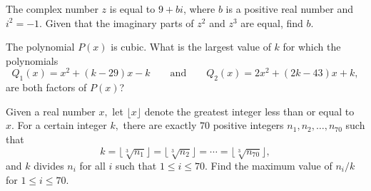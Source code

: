 %	


















\begin{question}[name={2007 AIME I, \href{https://artofproblemsolving.com/community/c4p784537}{Problem 3}}]
	The complex number $z$ is equal to $9+bi$, where $b$ is a positive real number and $i^{2}=-1$. Given that the imaginary parts of $z^{2}$ and $z^{3}$ are equal, find $b$.	
\end{question}


%	













\begin{question}[name={2007 AIME I, \href{https://artofproblemsolving.com/community/c4p784590}{Problem 8}}]
	The polynomial $P(x)$ is cubic. What is the largest value of $k$ for which the polynomials $$Q_{1}(x) = x^{2}+(k-29)x-k \qquad \text{and} \qquad Q_{2}(x) = 2x^{2}+(2k-43)x+k,$$ are both factors of $P(x)$?
\end{question}


%	












\begin{question}[name={2007 AIME II, \href{https://artofproblemsolving.com/community/c4p784590}{Problem 7}}]
	Given a real number $x,$ let $\lfloor x \rfloor$ denote the greatest integer less than or equal to $x.$ For a certain integer $k,$ there are exactly $70$ positive integers $n_{1}, n_{2}, \ldots, n_{70}$ such that $$k=\lfloor\sqrt[3]{n_{1}}\rfloor = \lfloor\sqrt[3]{n_{2}}\rfloor = \cdots = \lfloor\sqrt[3]{n_{70}}\rfloor,$$ and $k$ divides $n_{i}$ for all $i$ such that $1 \leq i \leq 70$. Find the maximum value of ${n_{i}}/{k}$ for $1\leq i \leq 70$.
\end{question}


